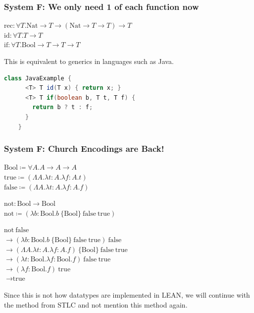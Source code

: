 \documentclass{beamer}
\newcommand{\bool}{\text{Bool}}
\newcommand{\nat}{\text{Nat}}
\newcommand{\true}{\text{true}}
\newcommand{\false}{\text{false}}
\begin{document}
\begin{frame}[fragile]
  \frametitle{System F: We only need 1 of each function now}

   $\text{rec} : \forall T . \nat \rightarrow T \rightarrow (\nat \rightarrow T \rightarrow T) \rightarrow T$ \\

  $\text{id} : \forall T . T \rightarrow T$ \\

  $\text{if} : \forall T . \bool \rightarrow T \rightarrow T \rightarrow T$ \\

  \vspace{5mm}

  This is equivalent to generics in languages such as Java.

  \begin{lstlisting}[language=Java]
    class JavaExample {
      <T> T id(T x) { return x; }
      <T> T if(boolean b, T t, T f) {
        return b ? t : f;
      }
    }
  \end{lstlisting}
\end{frame}

\begin{frame}[fragile]
  \frametitle{System F: Church Encodings are Back!}

  $\bool \coloneqq \forall A . A \rightarrow A \rightarrow A$ \\
  $\true \coloneqq (\Lambda A . \lambda t : A . \lambda f : A . t)$ \\
  $\false \coloneqq (\Lambda A . \lambda t : A . \lambda f : A . f)$ \\

  \vspace{5mm}

  $\text{not} : \bool \rightarrow \bool$ \\
  $\text{not} \coloneqq (\lambda b : \bool . b\ \{\bool\}\ \false\ \true)$

  \vspace{5mm}

  $\text{not}\ \false$ \\
  $\rightarrow (\lambda b : \bool . b\ \{\bool\}\ \false\ \true)\ \false$ \\
  $\rightarrow (\Lambda A . \lambda t : A . \lambda f : A . f)\ \{\bool\}\ \false\ \true$ \\
  $\rightarrow (\lambda t : \bool . \lambda f : \bool . f)\ \false\ \true$ \\
  $\rightarrow (\lambda f : \bool . f)\ \true$ \\
  $\rightarrow \true$ \\

  \vspace{5mm}

  Since this is not how datatypes are implemented in LEAN, we will continue with the method from STLC and not mention this method again.
\end{frame}
\end{document}
